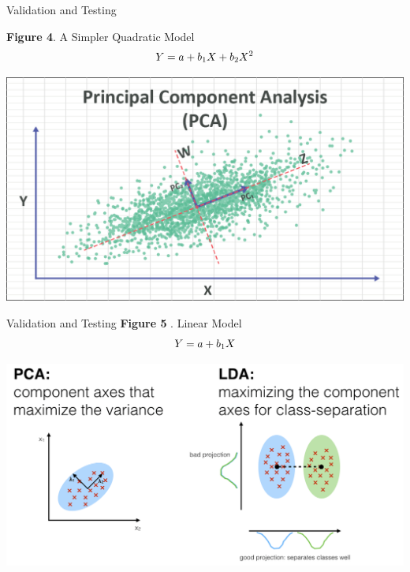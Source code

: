 \documentclass[11pt]{beamer}
\begin{document}
\begin{frame}{Validation and Testing}

\textbf{Figure 4}. A Simpler Quadratic Model
	\begin{equation}
	Y = a + b_1X + b_2X^2 \notag
	\end{equation}		
	 
	\begin{center}
	\includegraphics[scale=.6]{../05-pictures/lesson-2-2_pic_6.png}
	\end{center}
\end{frame}
\begin{frame}{Validation and Testing}
\textbf{Figure 5 }. Linear Model
	\begin{equation}
		Y = a + b_1X \notag
	\end{equation}
	\begin{center}
	\includegraphics[scale=.6]{../05-pictures/lesson-2-2_pic_7.png}
	\end{center}
\end{frame}
\end{document}
